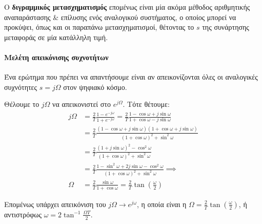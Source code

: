 \documentclass[11pt,a4paper,notitlepage,fleqn,draft]{article}
\begin{document}
Ο \textbf{διγραμμικός μετασχηματισμός} επομένως είναι μία ακόμα μέθοδος αριθμητικής αναπαράστασης \&
επίλυσης ενός αναλογικού συστήματος, ο οποίος μπορεί να προκύψει, όπως και οι παραπάνω μετασχηματισμοί,
θέτοντας το \( s \) της συνάρτησης μεταφοράς σε μία κατάλληλη τιμή.

\paragraph{Μελέτη απεικόνισης συχνοτήτων}
Ένα ερώτημα που πρέπει να απαντήσουμε είναι αν απεικονίζονται όλες οι αναλογικές συχνότητες \( s=jΩ \)
στον ψηφιακό κόσμο.

Θέλουμε το \( j\Omega \) να απεικονιστεί στο \( e^{j\Omega} \). Τότε θέτουμε:
\begin{align*}
	jΩ &= \frac{2}{T} \frac{1-e^{-j\omega }}{1+e^{-j\omega }} = \frac{2}{T} \frac{1-\cos \omega +j\sin \omega}{1+\cos \omega - j \sin \omega}
	\\ &= \frac{2}{T} \frac{
	(1-\cos \omega + j\sin \omega)(1+\cos \omega + j \sin \omega)
    }{(1+\cos \omega)^2 + \sin^2 \omega}
    \\ &= \frac{2}{Τ} \frac{(1+j\sin \omega)^2 - \cos^2\omega}{(1+\cos\omega)^2 + \sin^2\omega}
    \\ &= \frac{2}{T} \frac{1-\sin^2\omega + 2j\sin\omega - \cos^2\omega}{(1+\cos\omega)^2 + \sin^2\omega} \implies
    \\ \Omega &= \frac{2}{T} \frac{\sin\omega}{1+\cos \omega} = \frac{2}{T} \tan\left(\frac{\omega}{2}\right)
\end{align*}

Επομένως υπάρχει απεικόνιση του \( j\Omega \to e^{j\omega} \), η οποία είναι η \( \Omega = \frac{2}{T}\tan\left(\frac{\omega}{2}\right) \), ή αντιστρόφως \( \omega = 2\tan^{-1}\frac{\Omega T}{2} \).

\end{document}
